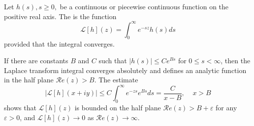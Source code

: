 \documentclass[12pt, a4paper, oneside, openright, titlepage]{book}
\begin{document}
\begin{defn}
    Let $h(s),s\geq0,$ be a continuous or piecewise continuous function on the positive real axis. The  is the function \begin{equation*}
        \mathcal{L}[h](z) = \int_0^{\infty}e^{-sz}h(s)ds
    \end{equation*}
    provided that the integral converges.
\end{defn}


\begin{prop}
    If there are constants $B$ and $C$ such that $|h(s)| \leq Ce^{Bs}$ for $0 \leq s < \infty$, then the Laplace transform integral converges absolutely and defines an analytic function in the half plane $\mathscr{R}e(z) > B$. The estimate \begin{equation*}
        |\mathcal{L}[h](x+iy)| \leq C\int_0^{\infty}e^{-zs}e^{Bs}ds = \frac{C}{x-B},\;\;\;\; x > B
    \end{equation*}
    shows that $\mathcal{L}[h](z)$ is bounded on the half plane $\mathscr{R}e(z) > B+\varepsilon$ for any $\varepsilon > 0$, and $\mathcal{L}[h](z)\rightarrow 0$ as $\mathscr{R}e(z) \rightarrow \infty$.
\end{prop}




\begin{appendices}


\end{appendices}
\end{document}
